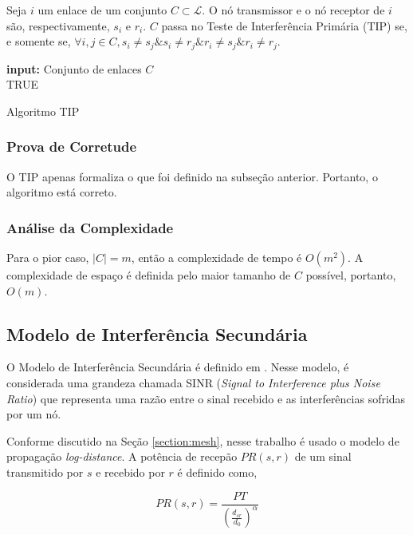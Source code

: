 Seja $i$ um enlace de um conjunto $C \subset \mathcal{L}$. O nó transmissor e o nó receptor de $i$ são, respectivamente, $s_{i}$ e $r_{i}$. $C$ passa no Teste de Interferência Primária (TIP) se, e somente se, $\forall i,j \in C, s_{i} \neq s_{j} \& s_{i} \neq r_{j} \& r_{i} \neq s_{j} \& r_{i} \neq r_{j}$. 

\begin{algorithm}[h]
	\SetVline
	{\bf input:} Conjunto de enlaces $C$\\
	\Return TRUE
\caption{Algoritmo TIP}
\label{alg:tip}
\end{algorithm}

\subsubsection{Prova de Corretude}

O TIP apenas formaliza o que foi definido na subseção anterior. Portanto, o algoritmo está correto. 

\subsubsection{Análise da Complexidade}

Para o pior caso, $|C|=m$, então a complexidade de tempo é $O(m^2)$. A complexidade de espaço é definida pelo maior tamanho de $C$ possível, portanto, $O(m)$.

\subsection{Modelo de Interferência Secundária}

O Modelo de Interferência Secundária é definido em \cite{sinr, models}. Nesse modelo, é considerada uma grandeza chamada SINR ({\it Signal to Interference plus Noise Ratio})  que representa uma razão entre o sinal recebido e as interferências sofridas por um nó.

Conforme discutido na Seção \ref{section:mesh}, nesse trabalho é usado o modelo de propagação {\it log-distance}. A potência de recepão $PR(s,r)$ de um sinal transmitido por $s$ e recebido por $r$ é definido como,

\begin{equation}
PR(s,r) = \frac{PT}{(\frac{d_{sr}}{d_{0}})^{\alpha}}
\label{eq:rp}
\end{equation}

